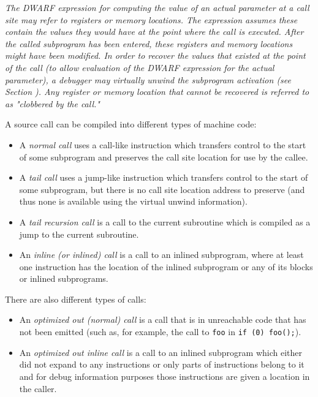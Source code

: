 \textit{The DWARF expression for computing the value of an actual parameter at
a call site may refer to registers or memory locations.  The expression
assumes these contain the values they would have at the point where the
call is executed. After the called subprogram has been entered, these
registers and memory locations might have been modified.  In order to
recover the values that existed at the point of the call (to allow
evaluation of the DWARF expression for the actual parameter), a debugger
may virtually unwind the subprogram activation 
(see Section ). Any
register or memory location that cannot be recovered is referred to as
"clobbered by the call."}

A source call can be compiled into different types of machine code:
\begin{itemize}
\item
A \textit{normal call} uses a call-like instruction which transfers 
control to the start of some subprogram and preserves the call site 
location for use by the callee.

\item
A \textit{tail call} uses a jump-like instruction which
transfers control to the start of some subprogram, but 
there is no call site location address to preserve
(and thus none is available using the 
virtual unwind information). 

\item
A \textit{tail recursion call} is a call
to the current subroutine which is compiled as a jump 
to the current subroutine.

\item
An \textit{inline (or inlined) call} is a call to an inlined subprogram,
where at least one instruction has the location of the inlined subprogram
or any of its blocks or inlined subprograms. 
\end{itemize}

There are also different types of  calls:
\begin{itemize}
\item
An \textit{optimized out (normal) call} is a call that is in unreachable code that 
has not been emitted (such as, for example, the call to \texttt{foo} in 
\texttt{if (0) foo();}).  
\item
An \textit{optimized out inline call}
is a call to an inlined subprogram which either did not expand to any instructions
or only parts of instructions belong to it and for debug information purposes those
instructions are given a location in the caller.
\end{itemize}

